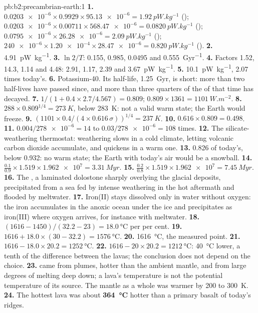 \begin{solution}{pb:b2:precambrian-earth:1}
\textbf{1.} $\num{0.0203e-6}\times0.9929\times\num{95.13e-6} = \qty{1.92}{pW.kg^{-1}}$
(); $\num{0.0203e-6}\times0.00711\times\num{568.47e-6} = \qty{0.0820}{pW.kg^{-1}}$
(); $\num{0.0795e-6}\times\num{26.28e-6} = \qty{2.09}{pW.kg^{-1}}$ ();
$\num{240e-6}\times\num{1.20e-4}\times\num{28.47e-6} = \qty{0.820}{pW.kg^{-1}}$ ().
\textbf{2.} \qty{4.91}{pW.kg^{-1}}.
\textbf{3.} $\ln2/T$: 0.155, 0.985, 0.0495 and \qty{0.555}{Gyr^{-1}}.
\textbf{4.} Factors 1.52, 14.3, 1.14 and 4.48: 2.91, 1.17, 2.39 and \qty{3.67}{pW.kg^{-1}}.
\textbf{5.} \qty{10.1}{pW.kg^{-1}}, 2.07 times today's.
\textbf{6.} Potassium-40. Its half-life, \qty{1.25}{Gyr}, is short: more than two half-lives
have passed since, and more than three quarters of the  of that time has decayed.
\textbf{7.} $1/(1 + 0.4\times2.7/4.567) = 0.809$; $0.809\times1361 = \qty{1101}{W.m^{-2}}$.
\textbf{8.} $288\times0.809^{1/4} = \qty{273}{K}$, below \qty{283}{K}: not a valid warm state;
the Earth would freeze.
\textbf{9.} $(1101\times0.4/(4\times0.616\,\sigma))^{1/4} = \qty{237}{K}$.
\textbf{10.} $0.616\times0.809 = 0.498$.
\textbf{11.} $0.004/\num{278e-6} = 14$ to $0.03/\num{278e-6} = 108$ times.
\textbf{12.} The silicate-weathering thermostat: weathering slows in a cold climate, letting
volcanic carbon dioxide accumulate, and quickens in a warm one.
\textbf{13.} 0.826 of today's, below 0.932: no warm state; the Earth with today's air would be a
snowball.
\textbf{14.} $\frac{0.1}{0.9}\times1.519\times\num{1.962e7} = \qty{3.31}{Myr}$.
\textbf{15.} $\frac{0.2}{0.8}\times1.519\times\num{1.962e7} = \qty{7.45}{Myr}$.
\textbf{16.} The , a laminated dolostone sharply overlying the glacial deposits,
precipitated from a sea fed by intense weathering in the hot aftermath and flooded by
meltwater.
\textbf{17.} Iron(II) stays dissolved only in water without oxygen: the iron accumulates in the
anoxic ocean under the ice and precipitates as iron(III) where oxygen arrives, for instance with
meltwater.
\textbf{18.} $(1616 - 1450)/(32.2 - 23) = \qty{18.0}{\celsius}$ per per cent.
\textbf{19.} $1616 + 18.0\times(30 - 32.2) = \qty{1576}{\celsius}$.
\textbf{20.} \qty{1616}{\celsius}, the measured point.
\textbf{21.} $1616 - 18.0\times20.2 = \qty{1252}{\celsius}$.
\textbf{22.} $1616 - 20\times20.2 = \qty{1212}{\celsius}$: \qty{40}{\celsius} lower, a tenth of
the difference between the lavas; the conclusion does not depend on the choice.
\textbf{23.}  came from plumes, hotter than the ambient mantle, and from large degrees of
melting deep down; a lava's temperature is not the potential temperature of its source. The
mantle as a whole was warmer by 200 to \qty{300}{K}.
\textbf{24.} The hottest  lava was about \textbf{\qty{364}{\celsius}} hotter than a
primary basalt of today's ridges.
\end{solution}
